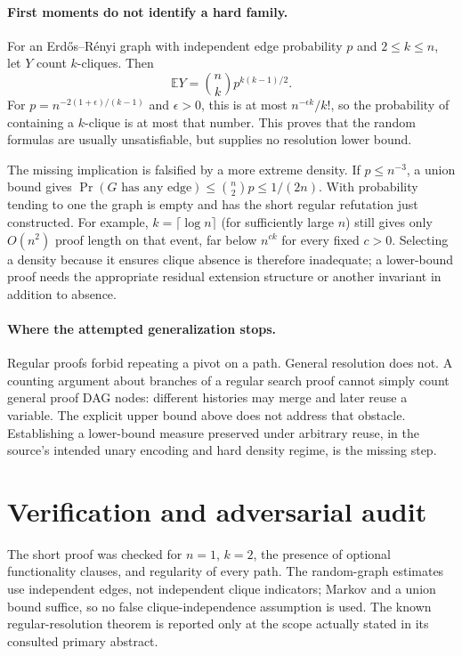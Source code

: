 \documentclass[11pt]{article}
\begin{document}
\paragraph{First moments do not identify a hard family.}
For an Erd\H{o}s--R\'enyi graph with independent edge probability $p$ and $2\le k\le n$, let $Y$ count $k$-cliques. Then
\[
 \mathbb EY=\binom nk p^{k(k-1)/2}.
\]
For $p=n^{-2(1+\epsilon)/(k-1)}$ and $\epsilon>0$, this is at most $n^{-\epsilon k}/k!$, so the probability of containing a $k$-clique is at most that number. This proves that the random formulas are usually unsatisfiable, but supplies no resolution lower bound.

The missing implication is falsified by a more extreme density. If $p\le n^{-3}$, a union bound gives $\Pr(G\text{ has any edge})\le\binom n2p\le1/(2n)$. With probability tending to one the graph is empty and has the short regular refutation just constructed. For example, $k=\lceil\log n\rceil$ (for sufficiently large $n$) still gives only $O(n^2)$ proof length on that event, far below $n^{c k}$ for every fixed $c>0$. Selecting a density because it ensures clique absence is therefore inadequate; a lower-bound proof needs the appropriate residual extension structure or another invariant in addition to absence.

\paragraph{Where the attempted generalization stops.}
Regular proofs forbid repeating a pivot on a path. General resolution does not. A counting argument about branches of a regular search proof cannot simply count general proof DAG nodes: different histories may merge and later reuse a variable. The explicit upper bound above does not address that obstacle. Establishing a lower-bound measure preserved under arbitrary reuse, in the source's intended unary encoding and hard density regime, is the missing step.
\section{Verification and adversarial audit}
The short proof was checked for $n=1$, $k=2$, the presence of optional functionality clauses, and regularity of every path. The random-graph estimates use independent edges, not independent clique indicators; Markov and a union bound suffice, so no false clique-independence assumption is used. The known regular-resolution theorem is reported only at the scope actually stated in its consulted primary abstract.
\end{document}
